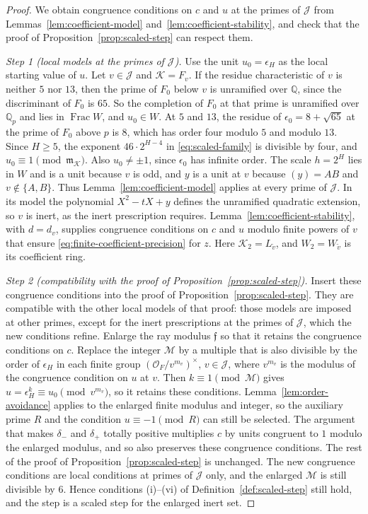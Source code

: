 \documentclass[11pt]{article}
\theoremstyle{plain}
\theoremstyle{definition}
\theoremstyle{remark}
\DeclareMathOperator{\Frac}{Frac}
\newcommand{\Q}{\mathbb Q}
\newcommand{\OO}{\mathcal O}
\begin{document}
\begin{proof}
We obtain congruence conditions on $c$ and $u$ at the primes of
$\mathcal J$ from Lemmas~\ref{lem:coefficient-model}
and~\ref{lem:coefficient-stability}, and check that the proof of
Proposition~\ref{prop:scaled-step} can respect them.

\emph{Step 1 (local models at the primes of $\mathcal J$).}  Use the
unit $u_0=\epsilon_H$ as the local starting value of $u$.  Let
$v\in\mathcal J$ and $\mathcal K=F_v$.  If the residue characteristic of
$v$ is neither $5$ nor $13$, then the prime of $F_0$ below $v$ is
unramified over $\Q$, since the discriminant of $F_0$ is $65$.  So the
completion of $F_0$ at that prime is unramified over $\Q_p$ and lies in
$\Frac W$, and $u_0\in W$.  At $5$ and $13$, the residue of
$\epsilon_0=8+\sqrt{65}$ at the prime of $F_0$ above $p$ is $8$, which
has order four modulo $5$ and modulo $13$.  Since $H\ge5$, the exponent
$46\cdot2^{H-4}$ in \eqref{eq:scaled-family} is divisible by four, and
$u_0\equiv1\pmod{\mathfrak m_{\mathcal K}}$.  Also $u_0\ne\pm1$, since
$\epsilon_0$ has infinite order.  The scale $h=2^H$ lies in $W$ and is a
unit because $v$ is odd, and $y$ is a unit at $v$ because $(y)=AB$ and
$v\notin\{A,B\}$.  Thus Lemma~\ref{lem:coefficient-model} applies at
every prime of $\mathcal J$.  In its model the polynomial $X^2-tX+y$
defines the unramified quadratic extension, so $v$ is inert, as the
inert prescription requires.  Lemma~\ref{lem:coefficient-stability},
with $d=d_v$, supplies congruence conditions on $c$ and $u$ modulo finite
powers of $v$ that ensure \eqref{eq:finite-coefficient-precision} for
$z$.  Here $\mathcal K_2=L_{\widetilde v}$, and $W_2=W_{\widetilde v}$
is its coefficient ring.

\emph{Step 2 (compatibility with the proof of
Proposition~\ref{prop:scaled-step}).}  Insert these congruence conditions
into the proof of Proposition~\ref{prop:scaled-step}.  They are
compatible with the other local models of that proof: those models are
imposed at other primes, except for the inert prescriptions at the
primes of $\mathcal J$, which the new conditions refine.  Enlarge the
ray modulus $\mathfrak f$ so that it retains the congruence conditions on
$c$.  Replace the integer $\mathcal M$ by a multiple that is also divisible
by the order of $\epsilon_H$ in each finite group
$(\OO_F/v^{m_v})^\times$, $v\in\mathcal J$, where $v^{m_v}$ is the
modulus of the congruence condition on $u$ at $v$.  Then
$k\equiv1\pmod{\mathcal M}$ gives $u=\epsilon_H^k\equiv u_0
\pmod{v^{m_v}}$, so it retains these conditions.
Lemma~\ref{lem:order-avoidance} applies to the enlarged finite modulus
and integer, so the auxiliary prime $R$ and the condition
$u\equiv-1\pmod R$ can still be selected.  The argument that makes
$\delta_-$ and $\delta_+$ totally positive multiplies $c$ by units
congruent to $1$ modulo the enlarged modulus, and so also preserves
these congruence conditions.  The rest of the proof of
Proposition~\ref{prop:scaled-step} is unchanged.  The new congruence
conditions are local conditions at primes of $\mathcal J$ only, and the
enlarged $\mathcal M$ is still divisible by $6$.  Hence conditions
(i)--(vi) of Definition~\ref{def:scaled-step} still hold, and the step
is a scaled step for the enlarged inert set.


\end{proof}
\end{document}
